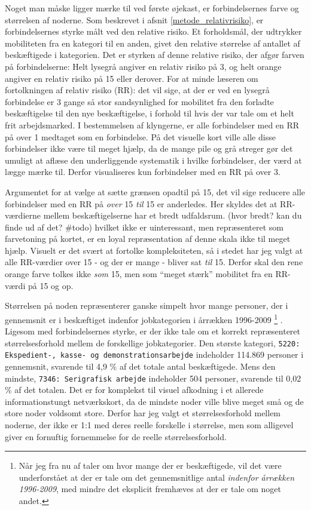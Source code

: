 Noget man måske ligger mærke til ved første øjekast, er forbindelsernes farve og størrelsen af noderne. Som beskrevet i afsnit \ref{metode_relativrisiko}, er forbindelsernes styrke målt ved den relative risiko. Et forholdsmål, der udtrykker mobiliteten fra en kategori til en anden, givet den relative størrelse af antallet af beskæftigede i kategorien. Det er styrken af denne relative risiko, der afgør farven på forbindelserne: Helt lysegrå angiver en relativ risiko på 3, og helt orange angiver en relativ risiko på 15 eller derover. For at minde læseren om fortolkningen af relativ risiko (RR):  det vil sige, at der er ved en lysegrå forbindelse er 3 gange så stor sandsynlighed for mobilitet fra den forladte beskæftigelse til den nye beskæftigelse, i forhold til hvis der var tale om et helt frit arbejdsmarked. I bestemmelsen af klyngerne, er alle forbindelser med en RR på over 1 medtaget som en forbindelse. På det visuelle kort ville alle disse forbindelser ikke være til meget hjælp, da de mange pile og grå streger gør det umuligt at aflæse den underliggende systematik i hvilke forbindelser, der værd at lægge mærke til. Derfor visualiseres kun forbindelser med en RR på over 3. 

Argumentet for at vælge at sætte grænsen opadtil på 15, det vil sige reducere alle forbindelser med en RR på \emph{over} 15 \emph{til} 15 er anderledes. Her skyldes det at RR-værdierne mellem beskæftigelserne har et bredt udfaldsrum. (hvor bredt? kan du finde ud af det? \#todo) hvilket ikke er uinteressant, men repræsenteret som farvetoning på kortet, er en loyal repræsentation af denne skala ikke til meget hjælp. Visuelt er det svært at fortolke kompleksiteten, så i stedet har jeg valgt at alle RR-værdier over 15 - og der er mange - bliver sat \emph{til} 15. Derfor skal den rene orange farve tolkes ikke \emph{som} 15, men som “meget stærk” mobilitet fra en RR-værdi på 15 og op.

Størrelsen på noden repræsenterer ganske simpelt hvor mange personer, der i gennemsnit er i beskæftiget indenfor jobkategorien i årrækken 1996-2009%
%
\footnote{Når jeg fra nu af taler om hvor mange der er beskæftigede, vil det være underforstået at der er tale om det gennemsnitlige antal \emph{indenfor årrækken 1996-2009}, med mindre det eksplicit fremhæves at der er tale om noget andet.}%
%
. Ligesom med forbindelsernes styrke, er der ikke tale om et korrekt repræsenteret størrelsesforhold mellem de forskellige jobkategorier. Den største kategori, \texttt{5220: Ekspedient-, kasse- og demonstrationsarbejde} indeholder 114.869 personer i gennemsnit, svarende til 4,9 \% af det totale antal beskæftigede. Mens den mindste, \texttt{7346: Serigrafisk arbejde} indeholder 504 personer, svarende til 0,02 \% af det totalen. Det er for komplekst til visuel afkodning i et allerede informationstungt netværkskort, da de mindste noder ville blive meget små og de store noder voldsomt store. Derfor har jeg valgt et størrelsesforhold mellem noderne, der ikke er 1:1 med deres reelle forskelle i størrelse, men som alligevel giver en fornuftig fornemmelse for de reelle størrelsesforhold.  

